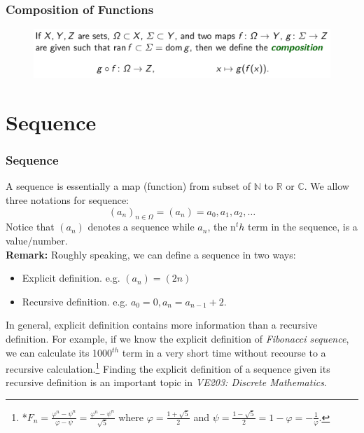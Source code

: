 \documentclass[10pt, t]{beamer}
\renewcommand{\emph}[1]{{\color{themecolor}\textsl{#1}}}
\newcommand{\N}{\mathbb{N}}
\newcommand{\R}{\mathbb{R}}
\newcommand{\nullspace}{~\\[15pt]}
\begin{document}
\begin{frame}
    \frametitle{Composition of Functions}
    \begin{figure}[H]
        \centering
        \includegraphics[width=\textwidth]{2020-09-30-13-34-51.png}
    \end{figure}

\end{frame}

\section{Sequence}
\begin{frame}
    \frametitle{Sequence}

    A sequence is essentially a map (function) from subset of $\N$ to $\R$ or $\mathbb{C}$. We allow three notations for sequence:
    $$\left(a_{n}\right)_{n \in \Omega}=\left(a_{n}\right)=a_{0}, a_{1}, a_{2}, \ldots$$
    Notice that  $(a_n)$ denotes a sequence while $a_n$, the n$^th$ term in the sequence, is a value/number.
    \nullspace\textbf{Remark:} Roughly speaking, we can define a sequence in two ways:
    \begin{itemize}
        \item Explicit definition. e.g. $(a_n)=(2n)$
        \item Recursive definition. e.g. $a_0=0, a_n=a_{n-1}+2$.
    \end{itemize}
    In general, explicit definition contains more information than a recursive definition. For example, if we know the explicit definition of \emph{Fibonacci sequence}, we can calculate its 1000$^{th}$ term in a very short time without recourse to a recursive calculation.\footnote[frame]{*$F_{n}=\frac{\varphi^{n}-\psi^{n}}{\varphi-\psi}=\frac{\varphi^{n}-\psi^{n}}{\sqrt{5}}$ where $\varphi=\frac{1+\sqrt{5}}{2}$ and $\psi=\frac{1-\sqrt{5}}{2}=1-\varphi=-\frac{1}{\varphi}$.} Finding the explicit definition of a sequence given its recursive definition is an important topic in \emph{VE203: Discrete Mathematics}.
\end{frame}
\end{document}
